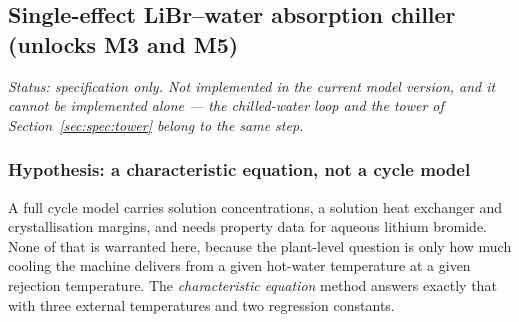 \documentclass[11pt]{article}
\begin{document}
\subsection{Single-effect LiBr--water absorption chiller (unlocks M3 and M5)}
\label{sec:spec:abs}

\emph{Status: specification only. Not implemented in the current model version, and it cannot be
implemented alone --- the chilled-water loop and the tower of Section~\ref{sec:spec:tower} belong to
the same step.}

\subsubsection{Hypothesis: a characteristic equation, not a cycle model}
A full cycle model carries solution concentrations, a solution heat exchanger and crystallisation
margins, and needs property data for aqueous lithium bromide. None of that is warranted here, because
the plant-level question is only how much cooling the machine delivers from a given hot-water
temperature at a given rejection temperature. The \emph{characteristic equation} method answers
exactly that with three external temperatures and two regression constants.
\end{document}
